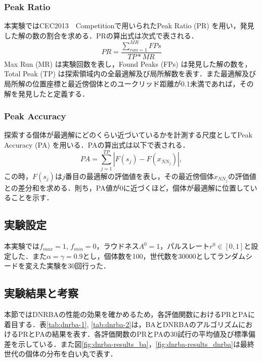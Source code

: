 \documentclass[a4j,11pt]{jarticle}
\begin{document}
\subsubsection{Peak Ratio}
本実験ではCEC2013　Competitionで用いられたPeak Ratio (PR) \cite{CEC2013} を用い，発見した解の数の割合を求める．PRの算出式は次式で表される．
\begin{equation}
PR=\frac{\sum_{run=1}^{MR}FPs}{TP*MR}
\end{equation}
Max Run (MR) は実験回数を表し，Found Peaks (FPs) は発見した解の数を，Total Peak (TP) は探索領域内の全最適解及び局所解数を表す．また最適解及び局所解の位置座標と最近傍個体とのユークリッド距離が0.1未満であれば，その解を発見したと定義する．

\subsubsection{Peak Accuracy}
探索する個体が最適解にどのくらい近づいているかを計測する尺度としてPeak Accuracy (PA) \cite{CEC2013} を用いる．PAの算出式は以下で表される．
\begin{equation}
PA=\sum_{j=1}^{TP}|F(s_j)-F(x_{NN_j})|,
\end{equation}
この時，$F(s_j)$は$j$番目の最適解の評価値を表し，その最近傍個体$x_{NN_j}$の評価値との差分和を求める．則ち，PA値が0に近づくほど，個体が最適解に位置していることを示す．

\FloatBarrier
\subsection{実験設定}
本実験では$f_{max}=1$, $f_{min}=0$，ラウドネス$A^0=1$，パルスレート$r^0 \in [0,1]$と設定した．また$\alpha= \gamma = 0.9$とし，個体数を100，世代数を30000としてランダムシードを変えた実験を30回行った．

\subsection{実験結果と考察}
\label{sss:DNRBA-results}
本節ではDNRBAの性能の効果を確かめるため，各評価関数におけるPRとPAに着目する．表\ref{tab:dnrba-1}, \ref{tab:dnrba-2}は，BAとDNRBAのアルゴリズムにおけるPRとPAの結果を表す．各評価関数のPRとPAの30試行の平均値及び標準偏差を示している．また図\ref{fig:dnrba-results_ba}，\ref{fig:dnrba-results_dnrba}は最終世代の個体の分布を白い丸で表す．
\end{document}
